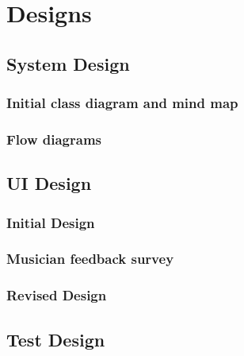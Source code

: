 \section{Designs}
\subsection{System Design}
\subsubsection{Initial class diagram and mind map}
\subsubsection{Flow diagrams}
\subsection{UI Design}
\subsubsection{Initial Design}
\subsubsection{Musician feedback survey}
\subsubsection{Revised Design}
\subsection{Test Design}